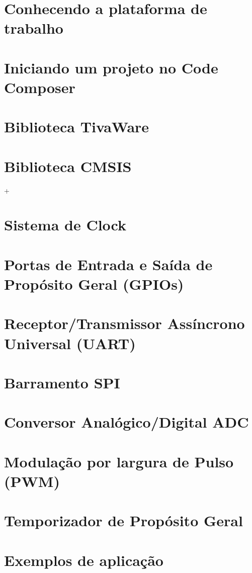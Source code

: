 \documentclass[a4paper,10pt,oneside]{book}
\begin{document}
\chapter{Conhecendo a plataforma de trabalho}


\chapter{Iniciando um projeto no Code Composer}


\chapter{Biblioteca TivaWare}


\chapter{Biblioteca CMSIS}
+

\chapter{Sistema de Clock}


\chapter{Portas de Entrada e Saída de Propósito Geral (GPIOs)}


\chapter{Receptor/Transmissor Assíncrono Universal (UART)}


\chapter{Barramento SPI}


\chapter{Conversor Analógico/Digital ADC}


\chapter{Modulação por largura de Pulso (PWM)}


\chapter{Temporizador de Propósito Geral}



\chapter{Exemplos de aplicação}





\end{document}

